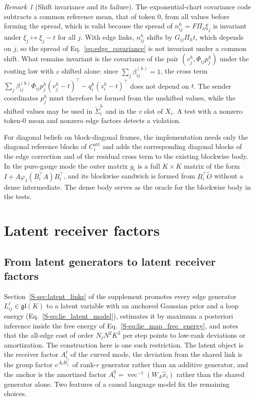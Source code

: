 \documentclass[11pt]{article}
\theoremstyle{definition}
\theoremstyle{remark}
\newtheorem{remark}[theorem]{Remark}
\providecommand{\gl}{\mathfrak{gl}}
\newcommand{\Ot}{\widetilde O}
\newcommand{\xh}{\hat x}
\newcommand{\Sref}[1]{\ref{S-#1}}
\begin{document}
\begin{remark}[Shift invariance and its failure]
\label{rem:shift}
The exponential-chart covariance code subtracts a common reference mean, that of token 0, from all values before forming the spread, which is valid because the spread of $n_{ij}^h=F\Pi_h\xi_j$ is invariant under $\xi_j\mapsto\xi_j-t$ for all $j$. With edge links, $n_{ij}^h$ shifts by $G_{ij}\Pi_ht$, which depends on $j$, so the spread of Eq.~\eqref{eq:edge_covariance} is not invariant under a common shift. What remains invariant is the covariance of the pair $(v_j^h,\Phi_{ij}p_j^h)$ under the routing law with $v$ shifted alone: since $\sum_j\beta_{ij}^{(h)}=1$, the cross term $\sum_j\beta_{ij}^{(h)}\Phi_{ij}p_j^h(v_j^h-t)^\top-q_i^h(z_i^h-t)^\top$ does not depend on $t$. The sender coordinates $p_j^h$ must therefore be formed from the unshifted values, while the shifted values may be used in $\widetilde\Sigma_i^h$ and in the $v$ slot of $X_i$. A test with a nonzero token-0 mean and nonzero edge factors detects a violation.
\end{remark}

For diagonal beliefs on block-diagonal frames, the implementation needs only the diagonal reference blocks of $C_i^{\mathrm{att}}$ and adds the corresponding diagonal blocks of the edge correction and of the residual cross term to the existing blockwise body. In the pure-gauge mode the outer matrix $g_i$ is a full $K\times K$ matrix of the form $I+A\varphi_1(B_i^\top A)B_i^\top$, and its blockwise sandwich is formed from $B_i^\top\Ot$ without a dense intermediate. The dense body serves as the oracle for the blockwise body in the tests.

\section{Latent receiver factors}
\label{sec:latent}

\subsection{From latent generators to latent receiver factors}

Section~\Sref{sec:latent_links} of the supplement promotes every edge generator $L^\ell_{ij}\in\gl(K)$ to a latent variable with an anchored Gaussian prior and a loop energy (Eq.~\Sref{eq:lie_latent_model}), estimates it by maximum a posteriori inference inside the free energy of Eq.~\Sref{eq:lie_map_free_energy}, and notes that the all-edge cost of order $N_\ell N^2K^3$ per step points to low-rank deviations or amortization. The construction here is one such restriction. The latent object is the receiver factor $A_i^\ell$ of the curved mode, the deviation from the shared link is the group factor $e^{A_iB_j^\top}$ of rank-$r$ generator rather than an additive generator, and the anchor is the amortized factor $A_i^0=\operatorname{vec}^{-1}(W_A\xh_i)$ rather than the shared generator alone. Two features of a causal language model fix the remaining choices.
\end{document}
